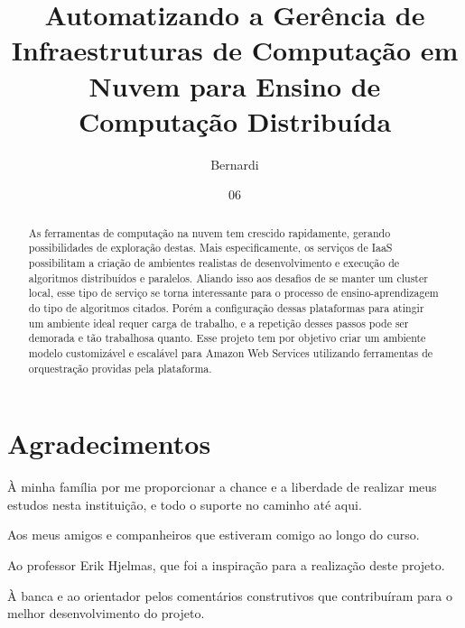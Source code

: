\documentclass[tg]{mdtufsm}
\title{Automatizando a Gerência de Infraestruturas de Computação em Nuvem para Ensino de Computação Distribuída}
\author{Bernardi}{Cezar Augusto Contini}
\institute{Centro de Tecnologia}
\date{06}{Julho}{2016}
\begin{document}
\maketitle



\chapter*{Agradecimentos}

À minha família por me proporcionar a chance e a liberdade de realizar meus estudos nesta instituição, e todo o suporte no caminho até aqui.

Aos meus amigos e companheiros que estiveram comigo ao longo do curso.

Ao professor Erik Hjelmas, que foi a inspiração para a realização deste projeto.

À banca e ao orientador pelos comentários construtivos que contribuíram para o melhor desenvolvimento do projeto.


\begin{abstract}
As ferramentas de computação na nuvem tem crescido rapidamente, gerando possibilidades de exploração destas. Mais especificamente, os serviços de IaaS possibilitam a criação de ambientes realistas de desenvolvimento e execução de algoritmos distribuídos e paralelos. Aliando isso aos desafios de se manter um cluster local, esse tipo de serviço se torna interessante para o processo de ensino-aprendizagem do tipo de algoritmos citados. Porém a configuração dessas plataformas para atingir um ambiente ideal requer carga de trabalho, e a repetição desses passos pode ser demorada e tão trabalhosa quanto. Esse projeto tem por objetivo criar um ambiente modelo customizável e escalável para Amazon Web Services utilizando ferramentas de orquestração providas pela plataforma.

\end{abstract}
\end{document}

